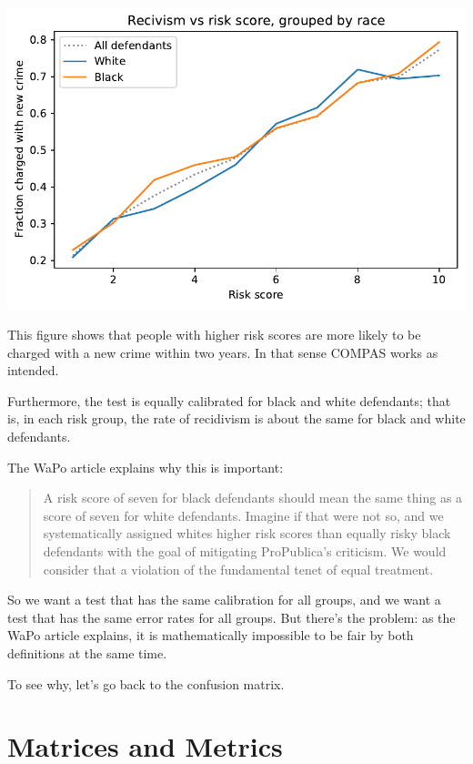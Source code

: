 \begin{center}
\includegraphics[scale=0.75]{02_calibration_files/02_calibration_21_0.pdf}
\end{center}

This figure shows that people with higher risk scores are more likely to
be charged with a new crime within two years. In that sense COMPAS works
as intended.

Furthermore, the test is equally calibrated for black and white
defendants; that is, in each risk group, the rate of recidivism is about
the same for black and white defendants.

The WaPo article explains why this is important:

\begin{quote}
A risk score of seven for black defendants should mean the same thing as
a score of seven for white defendants. Imagine if that were not so, and
we systematically assigned whites higher risk scores than equally risky
black defendants with the goal of mitigating ProPublica's criticism. We
would consider that a violation of the fundamental tenet of equal
treatment.
\end{quote}

So we want a test that has the same calibration for all groups, and we
want a test that has the same error rates for all groups. But there's
the problem: as the WaPo article explains, it is mathematically
impossible to be fair by both definitions at the same time.

To see why, let's go back to the confusion matrix.

\hypertarget{matrices-and-metrics}{%
\section{Matrices and Metrics}\label{matrices-and-metrics}}


